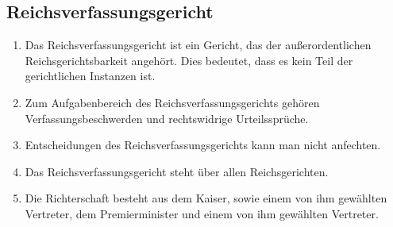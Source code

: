 \documentclass{article}
\begin{document}
\subsection{Reichsverfassungsgericht}
\begin{enumerate}[(1)]
    \item Das Reichsverfassungsgericht ist ein Gericht, das der außerordentlichen Reichsgerichtsbarkeit angehört. Dies bedeutet, dass es kein Teil der gerichtlichen Instanzen ist.
    \item Zum Aufgabenbereich des Reichsverfassungsgerichts gehören Verfassungsbeschwerden und rechtswidrige Urteilssprüche.
    \item Entscheidungen des Reichsverfassungsgerichts kann man nicht anfechten.
    \item Das Reichsverfassungsgericht steht über allen Reichsgerichten.
    \item Die Richterschaft besteht aus dem Kaiser, sowie einem von ihm gewählten Vertreter, dem Premierminister und einem von ihm gewählten Vertreter.
\end{enumerate}
\end{document}
